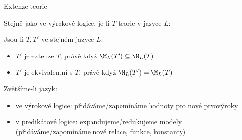 \documentclass{beamer}
\begin{document}
\begin{frame}{Extenze teorie}

    Stejně jako ve výrokové logice, je-li $T$ teorie v jazyce $L$:\pause 

    
    Jsou-li $T,T'$ ve stejném jazyce $L$:\pause 
    \begin{itemize}
        \item $T'$ je extenze $T$, právě když $\M_L(T')\subseteq\M_L(T)$\pause 
        \item $T'$ je ekvivalentní s $T$, právě když $\M_L(T')=\M_L(T)$\pause 
    \end{itemize}
       
    Zvětšíme-li jazyk:\pause 
    \begin{itemize}
        \item \alert{ve výrokové logice:} přidáváme/zapomínáme hodnoty pro nové prvovýroky\pause 
        \item \alert{v predikátové logice:} expandujeme/redukujeme modely (přidáváme/zapomínáme nové relace, funkce, konstanty)
    \end{itemize}

\end{frame}
\end{document}
